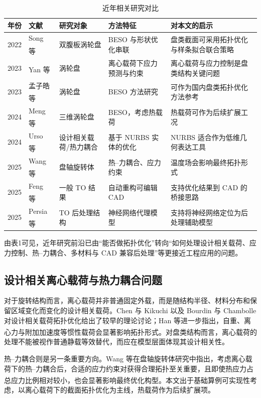 \documentclass{FRB-style}
\let\oldcite\cite
\renewcommand{\cite}[1]{\textsuperscript{\oldcite{#1}}}
\begin{document}
\begin{table}[H]
\centering
\caption{近年相关研究对比}
\small
\begin{tabularx}{\textwidth}{p{}p{}p{}p{}X}
\toprule
年份 & 文献 & 研究对象 & 方法特征 & 对本文的启示 \\
\midrule
2022 & Song 等\cite{Song2022} & 双腹板涡轮盘 & BESO 与形状优化串联 & 盘类截面可采用拓扑优化与样条拟合联合策略 \\
2023 & Yan 等\cite{Yan2023} & 涡轮盘 & 离心载荷下应力预测与约束 & 离心载荷与应力控制是盘类结构关键问题 \\
2023 & 孟子皓等\cite{Meng2023CN} & 涡轮盘 & BESO 方法研究 & 可作为国内盘类拓扑优化方法参考 \\
2024 & Meng 等\cite{Meng2024} & 三维涡轮盘 & BESO，考虑热载荷 & 热载荷可作为后续扩展工况 \\
2024 & Urso 等\cite{Urso2024DDL,Urso2024TM} & 设计相关载荷/热力耦合 & 基于 NURBS 实体的优化 & NURBS 适合作为低维几何表达工具 \\
2025 & Wang 等\cite{Wang2025} & 盘轴旋转体 & 热--力耦合、应力约束 & 温度场会影响最终拓扑形式 \\
2025 & Feng 等\cite{Feng2025} & 一般 TO 结果 & 自动重构可编辑 CAD & 支持优化结果到 CAD 的桥接思路 \\
2025 & Persia 等\cite{Persia2025} & TO 后处理结构 & 神经网络代理模型 & 支持将神经网络定位为后处理辅助模型 \\
\bottomrule
\end{tabularx}
\end{table}

由表1可见，近年研究前沿已由“能否做拓扑优化”转向“如何处理设计相关载荷、应力控制、热--力耦合、多材料与 CAD 兼容后处理”等更接近工程应用的问题。

\subsection{设计相关离心载荷与热力耦合问题}

对于旋转结构而言，离心载荷并非普通固定外载，而是随结构半径、材料分布和保留区域变化而变化的设计相关载荷。Chen 与 Kikuchi 以及 Bourdin 与 Chambolle 对设计相关载荷拓扑优化给出了较早的理论讨论；Han 等进一步指出，自重、离心力与附加加速度等惯性载荷会显著影响拓扑形式\cite{Chen2001,Bourdin2003,Han2021}。对盘类结构而言，离心载荷的处理不能被视作普通静载等效替代，而应在模型层面体现其设计相关性。

热--力耦合则是另一条重要方向。Wang 等在盘轴旋转体研究中指出，考虑离心载荷下的热--力耦合后，合适的应力约束对获得合理拓扑至关重要，且即使热应力占总应力比例相对较小，也会显著影响最终优化构型\cite{Wang2025}。本文出于基础算例可实现性考虑，以离心载荷下的截面拓扑优化为主线，热载荷作为后续扩展项。
\end{document}
